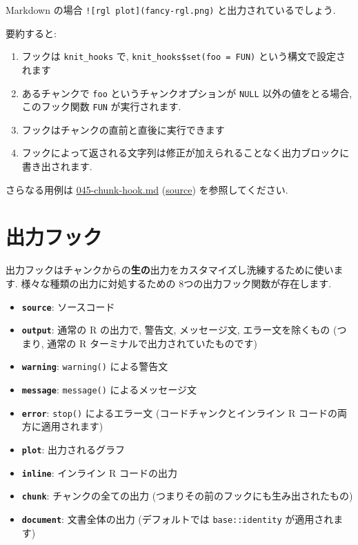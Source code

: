 \documentclass[
  lualatex,ja=standard,jafont=noto-otf]{bxjsreport}
\providecommand{\tightlist}{%
  \setlength{\itemsep}{0pt}\setlength{\parskip}{0pt}}
\begin{document}
Markdown の場合 \texttt{!{[}rgl\ plot{]}(fancy-rgl.png)}
と出力されているでしょう.

要約すると:

\begin{enumerate}
\def\labelenumi{\arabic{enumi}.}
\tightlist
\item
  フックは \texttt{knit\_hooks} で,
  \texttt{knit\_hooks\$set(foo\ =\ FUN)} という構文で設定されます
\item
  あるチャンクで \texttt{foo} というチャンクオプションが \texttt{NULL}
  以外の値をとる場合, このフック関数 \texttt{FUN} が実行されます.
\item
  フックはチャンクの直前と直後に実行できます
\item
  フックによって返される文字列は修正が加えられることなく出力ブロックに書き出されます.
\end{enumerate}

さらなる用例は
\href{https://github.com/yihui/knitr-examples/blob/master/045-chunk-hook.md}{045-chunk-hook.md}
(\href{https://github.com/yihui/knitr-examples/blob/master/045-chunk-hook.Rmd}{source})
を参照してください.

\hypertarget{ux51faux529bux30d5ux30c3ux30af}{%
\section{出力フック}\label{ux51faux529bux30d5ux30c3ux30af}}

出力フックはチャンクからの\textbf{生の}出力をカスタマイズし洗練するために使います.
様々な種類の出力に対処するための 8つの出力フック関数が存在します.

\begin{itemize}
\tightlist
\item
  \textbf{\texttt{source}}: ソースコード
\item
  \textbf{\texttt{output}}: 通常の R の出力で, 警告文, メッセージ文,
  エラー文を除くもの (つまり, 通常の R
  ターミナルで出力されていたものです)
\item
  \textbf{\texttt{warning}}: \texttt{warning()} による警告文
\item
  \textbf{\texttt{message}}: \texttt{message()} によるメッセージ文
\item
  \textbf{\texttt{error}}: \texttt{stop()} によるエラー文
  (コードチャンクとインライン R コードの両方に適用されます)
\item
  \textbf{\texttt{plot}}: 出力されるグラフ
\item
  \textbf{\texttt{inline}}: インライン R コードの出力
\item
  \textbf{\texttt{chunk}}: チャンクの全ての出力
  (つまりその前のフックにも生み出されたもの)
\item
  \textbf{\texttt{document}}: 文書全体の出力 (デフォルトでは
  \texttt{base::identity} が適用されます)
\end{itemize}
\end{document}
